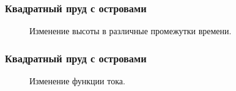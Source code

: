 \documentclass[10pt,utf8,presentation,compress]{beamer}
\begin{document}
\begin{frame}
\frametitle{Квадратный пруд с островами}
	\begin{figure}[H]
		\centering
		\hfill
		\caption{Изменение высоты в различные промежутки времени.}
	\end{figure}
\end{frame}

\begin{frame}
\frametitle{Квадратный пруд с островами}
	\begin{figure}[H]
		\centering
		\hfill
		\caption{Изменение функции тока.}
	\end{figure}
\end{frame}
\end{document}
